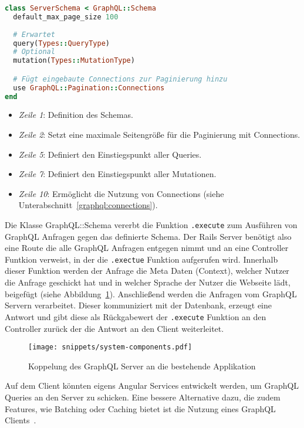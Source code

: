 \begin{lstlisting}[language=Ruby,float=h!,caption={graphql-ruby Schema Definition und Festlegung der Einstiegpunkte query und mutation}, label={lst:graphql:schema}]
class ServerSchema < GraphQL::Schema
  default_max_page_size 100
  
  # Erwartet
  query(Types::QueryType)
  # Optional
  mutation(Types::MutationType)

  # Fügt eingebaute Connections zur Paginierung hinzu
  use GraphQL::Pagination::Connections
end
\end{lstlisting}

\begin{itemize}
	\setlength\itemsep{-1em}
	\item \emph{Zeile 1}: Definition des Schemas.
	\item \emph{Zeile 2}: Setzt eine maximale Seitengröße für die Paginierung mit Connections.
	\item \emph{Zeile 5}: Definiert den Einstiegspunkt aller Queries.
	\item \emph{Zeile 7}: Definiert den Einstiegspunkt aller Mutationen.
	\item \emph{Zeile 10}: Ermöglicht die Nutzung von Connections (siehe Unterabschnitt~\ref{graphql:connections}).
\end{itemize}

Die Klasse GraphQL::Schema vererbt die Funktion \lstinline|.execute| zum Ausführen von GraphQL Anfragen gegen das definierte Schema. Der Rails Server benötigt also eine Route die alle GraphQL Anfragen entgegen nimmt und an eine Controller Funtkion verweist, in der die \lstinline|.exectue| Funktion aufgerufen wird. Innerhalb dieser Funktion werden der Anfrage die Meta Daten (Context), welcher Nutzer die Anfrage geschickt hat und in welcher Sprache der Nutzer die Webseite lädt, beigefügt (siehe Abbildung~\ref{graphql:integration}). Anschließend werden die Anfragen vom GraphQL Servern verarbeitet. Dieser kommuniziert mit der Datenbank, erzeugt eine Antwort und gibt diese als Rückgabewert der \lstinline|.execute| Funktion an den Controller zurück der die Antwort an den Client weiterleitet.

\begin{figure}[h!]
	\centering
	\texttt{[image: snippets/system-components.pdf]}
	\caption{Koppelung des GraphQL Server an die bestehende Applikation}
	\label{graphql:integration}
\end{figure}

Auf dem Client könnten eigens Angular Services entwickelt werden, um GraphQL Queries an den Server zu schicken. Eine bessere Alternative dazu, die zudem Features, wie Batching oder Caching bietet ist die Nutzung eines GraphQL Clients~\cite{graphql-client}. 

